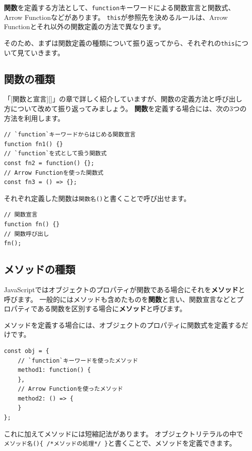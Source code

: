 \textbf{関数}を定義する方法として、\texttt{function}キーワードによる関数宣言と関数式、Arrow
Functionなどがあります。
\texttt{this}が参照先を決めるルールは、Arrow
Functionとそれ以外の関数定義の方法で異なります。

そのため、まずは関数定義の種類について振り返ってから、それぞれの\texttt{this}について見ていきます。

\hypertarget{type-of-function}{%
\subsection{関数の種類}\label{type-of-function}}

「{[}関数と宣言{]}{[}{]}」の章で詳しく紹介していますが、関数の定義方法と呼び出し方について改めて振り返ってみましょう。
\textbf{関数}を定義する場合には、次の3つの方法を利用します。

\begin{lstlisting}
// `function`キーワードからはじめる関数宣言
function fn1() {}
// `function`を式として扱う関数式
const fn2 = function() {};
// Arrow Functionを使った関数式
const fn3 = () => {};
\end{lstlisting}

それぞれ定義した関数は\texttt{関数名()}と書くことで呼び出せます。

\begin{lstlisting}
// 関数宣言
function fn() {}
// 関数呼び出し
fn();
\end{lstlisting}

\hypertarget{type-of-method}{%
\subsection{メソッドの種類}\label{type-of-method}}

JavaScriptではオブジェクトのプロパティが関数である場合にそれを\textbf{メソッド}と呼びます。
一般的にはメソッドも含めたものを\textbf{関数}と言い、関数宣言などとプロパティである関数を区別する場合に\textbf{メソッド}と呼びます。

メソッドを定義する場合には、オブジェクトのプロパティに関数式を定義するだけです。

\begin{lstlisting}
const obj = {
    // `function`キーワードを使ったメソッド
    method1: function() {
    },
    // Arrow Functionを使ったメソッド
    method2: () => {
    }
};
\end{lstlisting}

これに加えてメソッドには短縮記法があります。 オブジェクトリテラルの中で
\texttt{メソッド名()\{ /*メソッドの処理*/ \}}と書くことで、メソッドを定義できます。

